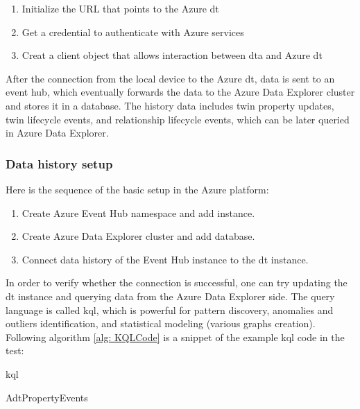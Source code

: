 \begin{enumerate}
    \item Initialize the URL that points to the Azure \gls{dt}
    \item Get a credential to authenticate with Azure services
    \item Creat a client object that allows interaction between \gls{dta} and Azure \gls{dt}
    \end{enumerate}

After the connection from the local device to the Azure \gls{dt}, 
data is sent to an event hub, which eventually forwards the data to 
the Azure Data Explorer cluster and stores it in a database. The history data includes 
twin property updates, twin lifecycle events, and relationship lifecycle events, which 
can be later queried in Azure Data Explorer.

\subsubsection{Data history setup}
Here is the sequence of the basic setup in the Azure platform:
\begin{enumerate}
    \item Create Azure Event Hub namespace and add instance.
    \item Create Azure Data Explorer cluster and add database.
    \item Connect data history of the Event Hub instance to the \gls{dt} instance.
\end{enumerate}

In order to verify whether the connection is successful, one can try updating the 
\gls{dt} instance and querying data from the Azure Data Explorer side. The query
language is called \gls{kql}, which is powerful for pattern discovery, anomalies 
and outliers identification, and statistical modeling (various graphs creation). 
Following algorithm \ref{alg: KQLCode} is a snippet of the example \gls{kql} code in the test: 

\begin{algorithm}
    \caption{\gls{kql}}
    \label{alg: KQLCode}
    \begin{algorithmic}
        \State  AdtPropertyEvents 
    \end{algorithmic}
\end{algorithm}


